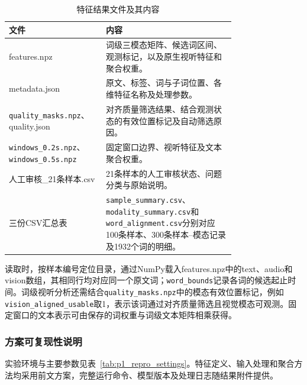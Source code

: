 \begin{table}[H]
    \centering\small
    \caption{特征结果文件及其内容}
    \label{tab:p1_files}
    \renewcommand{\arraystretch}{1.18}
    \begin{tabular}{@{}>{\raggedright\arraybackslash}p{0.26\linewidth}>{\raggedright\arraybackslash}p{0.50\linewidth}@{}}
        \toprule
        文件 & 内容\\ \midrule
        features.npz & 词级三模态矩阵、候选词区间、观测标记，以及原生视听特征和聚合权重。\\
        metadata.json & 原文、标签、词与子词位置、各维特征名称及处理参数。\\
        \nolinkurl{quality_masks.npz}、\newline quality.json & 对齐质量筛选结果、结合观测状态的有效位置标记及自动筛选原因。\\
        \nolinkurl{windows_0.2s.npz}、\newline\nolinkurl{windows_0.5s.npz} & 固定窗口边界、视听特征及文本聚合权重。\\
        人工审核\_21条样本.csv & 21条样本的人工审核状态、问题分类与原始说明。\\
        三份CSV汇总表 & \nolinkurl{sample_summary.csv}、\nolinkurl{modality_summary.csv}和\nolinkurl{word_alignment.csv}分别对应100条样本、300条样本--模态记录及1932个词的明细。\\
        \bottomrule
    \end{tabular}
\end{table}

读取时，按样本编号定位目录，通过NumPy载入features.npz中的text、audio和vision数组，其相同行均对应同一个原文词；\nolinkurl{word_bounds}记录各词的候选起止时间。词级视听分析还需结合\nolinkurl{quality_masks.npz}中的模态有效位置标记，例如\nolinkurl{vision_aligned_usable}取1，表示该词通过对齐质量筛选且视觉模态可观测。固定窗口的文本表示可由保存的词权重与词级文本矩阵相乘获得。

\subsubsection{方案可复现性说明}
\label{sec:p1_reproducibility}

实验环境与主要参数见表~\ref{tab:p1_repro_settings}。特征定义、输入处理和聚合方法均采用前文方案，完整运行命令、模型版本及处理日志随结果附件提供。

